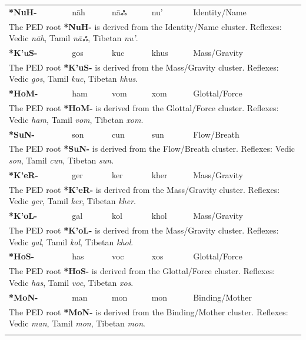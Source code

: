 \begin{longtable}{p{} p{} p{} p{} p{}}
\textbf{*NuH-} & nāh & nāஃ & nu' & Identity/Name \\ 
\multicolumn{5}{p{\textwidth}}{\small The PED root \textbf{*NuH-} is derived from the Identity/Name cluster. Reflexes: Vedic \textit{nāh}, Tamil \textit{nāஃ}, Tibetan \textit{nu'}. } \\ \addlinespace 
\textbf{*K'uS-} & gos & kuc & khus & Mass/Gravity \\ 
\multicolumn{5}{p{\textwidth}}{\small The PED root \textbf{*K'uS-} is derived from the Mass/Gravity cluster. Reflexes: Vedic \textit{gos}, Tamil \textit{kuc}, Tibetan \textit{khus}. } \\ \addlinespace 
\textbf{*HoM-} & ham & vom & xom & Glottal/Force \\ 
\multicolumn{5}{p{\textwidth}}{\small The PED root \textbf{*HoM-} is derived from the Glottal/Force cluster. Reflexes: Vedic \textit{ham}, Tamil \textit{vom}, Tibetan \textit{xom}. } \\ \addlinespace 
\textbf{*SuN-} & son & cun & sun & Flow/Breath \\ 
\multicolumn{5}{p{\textwidth}}{\small The PED root \textbf{*SuN-} is derived from the Flow/Breath cluster. Reflexes: Vedic \textit{son}, Tamil \textit{cun}, Tibetan \textit{sun}. } \\ \addlinespace 
\textbf{*K'eR-} & ger & ker & kher & Mass/Gravity \\ 
\multicolumn{5}{p{\textwidth}}{\small The PED root \textbf{*K'eR-} is derived from the Mass/Gravity cluster. Reflexes: Vedic \textit{ger}, Tamil \textit{ker}, Tibetan \textit{kher}. } \\ \addlinespace 
\textbf{*K'oL-} & gal & kol & khol & Mass/Gravity \\ 
\multicolumn{5}{p{\textwidth}}{\small The PED root \textbf{*K'oL-} is derived from the Mass/Gravity cluster. Reflexes: Vedic \textit{gal}, Tamil \textit{kol}, Tibetan \textit{khol}. } \\ \addlinespace 
\textbf{*HoS-} & has & voc & xos & Glottal/Force \\ 
\multicolumn{5}{p{\textwidth}}{\small The PED root \textbf{*HoS-} is derived from the Glottal/Force cluster. Reflexes: Vedic \textit{has}, Tamil \textit{voc}, Tibetan \textit{xos}. } \\ \addlinespace 
\textbf{*MoN-} & man & mon & mon & Binding/Mother \\ 
\multicolumn{5}{p{\textwidth}}{\small The PED root \textbf{*MoN-} is derived from the Binding/Mother cluster. Reflexes: Vedic \textit{man}, Tamil \textit{mon}, Tibetan \textit{mon}. } \\ \addlinespace 

\end{longtable}
